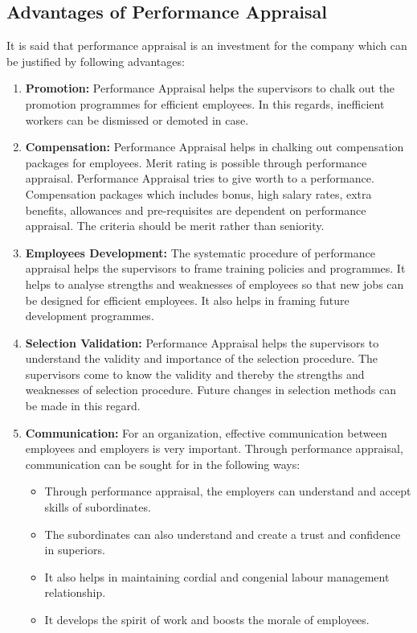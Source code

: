 \documentclass[]{book}
\providecommand{\tightlist}{%
  \setlength{\itemsep}{0pt}\setlength{\parskip}{0pt}}
\begin{document}
\hypertarget{advantages-of-performance-appraisal}{%
\subsection{Advantages of Performance Appraisal}\label{advantages-of-performance-appraisal}}

It is said that performance appraisal is an investment for the company which can be justified by following advantages:

\begin{enumerate}
\def\labelenumi{\arabic{enumi}.}
\item
  \textbf{Promotion:} Performance Appraisal helps the supervisors to chalk out the promotion programmes for efficient employees. In this regards, inefficient workers can be dismissed or demoted in case.
\item
  \textbf{Compensation:} Performance Appraisal helps in chalking out compensation packages for employees. Merit rating is possible through performance appraisal. Performance Appraisal tries to give worth to a performance. Compensation packages which includes bonus, high salary rates, extra benefits, allowances and pre-requisites are dependent on performance appraisal. The criteria should be merit rather than seniority.
\item
  \textbf{Employees Development:} The systematic procedure of performance appraisal helps the supervisors to frame training policies and programmes. It helps to analyse strengths and weaknesses of employees so that new jobs can be designed for efficient employees. It also helps in framing future development programmes.
\item
  \textbf{Selection Validation:} Performance Appraisal helps the supervisors to understand the validity and importance of the selection procedure. The supervisors come to know the validity and thereby the strengths and weaknesses of selection procedure. Future changes in selection methods can be made in this regard.
\item
  \textbf{Communication:} For an organization, effective communication between employees and employers is very important. Through performance appraisal, communication can be sought for in the following ways:

  \begin{itemize}
  \tightlist
  \item
    Through performance appraisal, the employers can understand and accept skills of subordinates.
  \item
    The subordinates can also understand and create a trust and confidence in superiors.
  \item
    It also helps in maintaining cordial and congenial labour management relationship.
  \item
    It develops the spirit of work and boosts the morale of employees.
  \end{itemize}
\end{enumerate}
\end{document}
